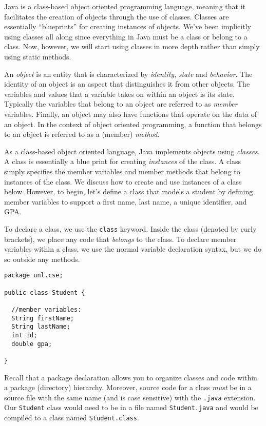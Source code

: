 

Java is a class-based object oriented programming language, meaning
that it facilitates the creation of objects through the use of classes.
Classes are essentially ``blueprints'' for creating instances of 
objects.  We've been implicitly using classes all along since everything
in Java must be a class or belong to a class.  Now, however, we will
start using classes in more depth rather than simply using static 
methods.

An \emph{object} is an entity that is characterized by \emph{identity}, 
\emph{state} and \emph{behavior}.  The identity of an object is an
aspect that distinguishes it from other objects.  The variables and
values that a variable takes on within an object is its state.  Typically
the variables that belong to an object are referred to as \emph{member} 
variables.  Finally, an object may also have functions that operate
on the data of an object.  In the context of object oriented programming, 
a function that belongs to an object is referred to as a (member)
\emph{method}.

As a class-based object oriented language, Java implements objects
using \emph{classes}.  A class is essentially a blue print for creating
\emph{instances} of the class.  A class simply specifies the
member variables and member methods that belong to instances of the
class.  We discuss how to create and use instances of a class below.
However, to begin, let's define a class that models a student by
defining member variables to support a first name, last name, a
unique identifier, and GPA.

To declare a class, we use the \texttt{class} keyword.
Inside the class (denoted by curly brackets), we place any code that
\emph{belongs} to the class.  To declare member variables within
a class, we use the normal variable declaration syntax, but we
do so outside any methods.

\begin{verbatim}
package unl.cse;

public class Student {

  //member variables:
  String firstName;
  String lastName;
  int id;
  double gpa;

}
\end{verbatim}

Recall that a package declaration allows you to organize classes and
code within a package (directory) hierarchy.  Moreover, source code
for a class \emph{must} be in a source file with the same name 
(and is case sensitive) with the \texttt{.java} extension.
Our \texttt{Student} class would need to be in a file named
\texttt{Student.java} and would be compiled to a class named
\texttt{Student.class}.  


